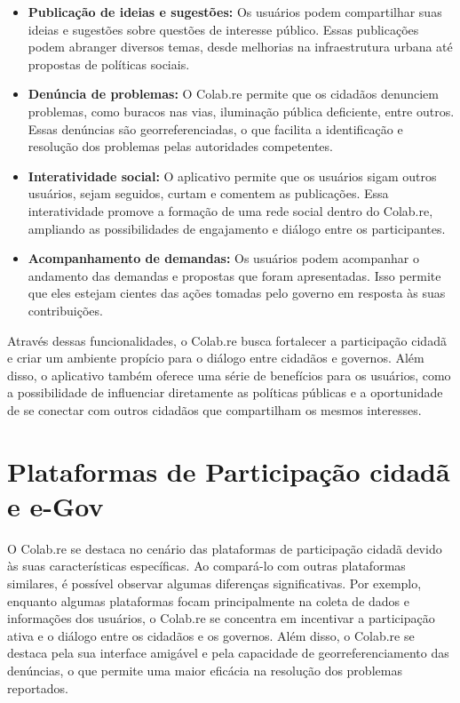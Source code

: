 \begin{itemize}
  \item \textbf{Publicação de ideias e sugestões:} Os usuários podem compartilhar suas ideias e sugestões sobre questões de interesse público. Essas publicações podem abranger diversos temas, desde melhorias na infraestrutura urbana até propostas de políticas sociais.

  \item \textbf{Denúncia de problemas:} O Colab.re permite que os cidadãos denunciem problemas, como buracos nas vias, iluminação pública deficiente, entre outros. Essas denúncias são georreferenciadas, o que facilita a identificação e resolução dos problemas pelas autoridades competentes.

  \item \textbf{Interatividade social:} O aplicativo permite que os usuários sigam outros usuários, sejam seguidos, curtam e comentem as publicações. Essa interatividade promove a formação de uma rede social dentro do Colab.re, ampliando as possibilidades de engajamento e diálogo entre os participantes.

  \item \textbf{Acompanhamento de demandas:} Os usuários podem acompanhar o andamento das demandas e propostas que foram apresentadas. Isso permite que eles estejam cientes das ações tomadas pelo governo em resposta às suas contribuições.
\end{itemize}

Através dessas funcionalidades, o Colab.re busca fortalecer a participação cidadã e criar um ambiente propício para o diálogo entre cidadãos e governos. Além disso, o aplicativo também oferece uma série de benefícios para os usuários, como a possibilidade de influenciar diretamente as políticas públicas e a oportunidade de se conectar com outros cidadãos que compartilham os mesmos interesses.

\section*{Plataformas de Participação cidadã e e-Gov}
O Colab.re se destaca no cenário das plataformas de participação cidadã devido às suas características específicas. Ao compará-lo com outras plataformas similares, é possível observar algumas diferenças significativas. Por exemplo, enquanto algumas plataformas focam principalmente na coleta de dados e informações dos usuários, o Colab.re se concentra em incentivar a participação ativa e o diálogo entre os cidadãos e os governos. Além disso, o Colab.re se destaca pela sua interface amigável e pela capacidade de georreferenciamento das denúncias, o que permite uma maior eficácia na resolução dos problemas reportados.

